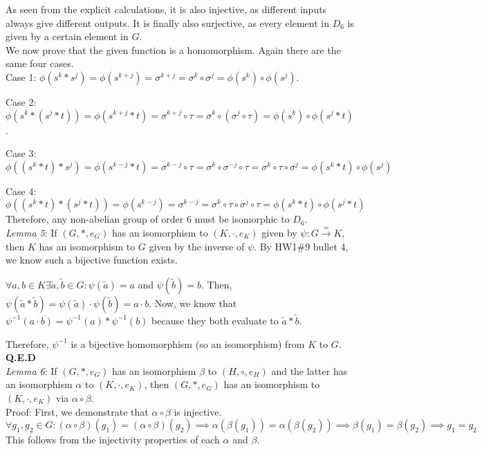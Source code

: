 \documentclass{amsart}
\begin{document}
\begin{enumerate}[itemsep=0.4in]
As seen from the explicit calculations, it is also injective, as different inputs always give different outputs. It is finally also surjective, as every element in $D_6$ is given by a certain element in $G$. \\

We now prove that the given function is a homomorphism. Again there are the same four cases. \\

Case 1: $\phi(s^k*s^j)=\phi(s^{k+j})=\sigma^{k+j}=\sigma^k\circ\sigma^j=\phi(s^k)\circ\phi(s^j)$.

Case 2: $\phi(s^k*(s^j*t))=\phi(s^{k+j}*t)=\sigma^{k+j}\circ\tau=\sigma^k\circ(\sigma^j\circ\tau)=\phi(s^k)\circ\phi(s^j*t)$.

Case 3: $\phi((s^k*t)*s^j)=\phi(s^{k-j}*t)=\sigma^{k-j}\circ\tau=\sigma^k\circ\sigma^{-j}\circ\tau=\sigma^k\circ\tau\circ\sigma^j=\phi(s^k*t)\circ\phi(s^j)$

Case 4: $\phi((s^k*t)*(s^j*t))=\phi(s^{k-j})=\sigma^{k-j}=\sigma^k\circ\tau\circ\sigma^j\circ\tau=\phi(s^k*t)\circ\phi(s^j*t)$\\

Therefore, any non-abelian group of order 6 must be isomorphic to $D_6$.\\

\emph{Lemma 5}: If $(G,*,e_G)$ has an isomorphism to $(K,\cdot,e_K)$ given by $\psi:G\xrightarrow{\simeq} K$, then $K$ has an isomorphism to $G$ given by the inverse of $\psi$. By HW1\#9 bullet 4, we know such a bijective function exists.

$\forall a,b\in K\exists\tilde a,\tilde b\in G:\psi(\tilde a)=a$ and $\psi(\tilde b)=b$. Then, $\psi(\tilde a*\tilde b)=\psi(\tilde a)\cdot\psi(\tilde b)=a\cdot b$. Now, we know that $\psi^{-1}(a\cdot b)=\psi^{-1}(a)*\psi^{-1}(b)$ because they both evaluate to $\tilde a*\tilde b$. 

Therefore, $\psi^{-1}$ is a bijective homomorphism (so an isomorphism) from $K$ to $G$. \textbf{Q.E.D}\\

\emph{Lemma 6}: If $(G,*,e_G)$ has an isomorphism $\beta$ to $(H,\circ,e_H)$ and the latter has an isomorphism $\alpha$ to $(K,\cdot,e_K)$, then $(G,*,e_G)$ has an isomorphism to $(K,\cdot,e_K)$ via $\alpha\circ\beta$.\\

Proof: First, we demonstrate that $\alpha\circ\beta$ is injective. $$\forall g_1,g_2\in G:(\alpha\circ\beta)(g_1)=(\alpha\circ\beta)(g_2)\implies \alpha(\beta(g_1))=\alpha(\beta(g_2))\implies\beta(g_1)=\beta(g_2)\implies g_1=g_2$$ This follows from the injectivity properties of each $\alpha$ and $\beta$.\\


\end{enumerate}
\end{document}
